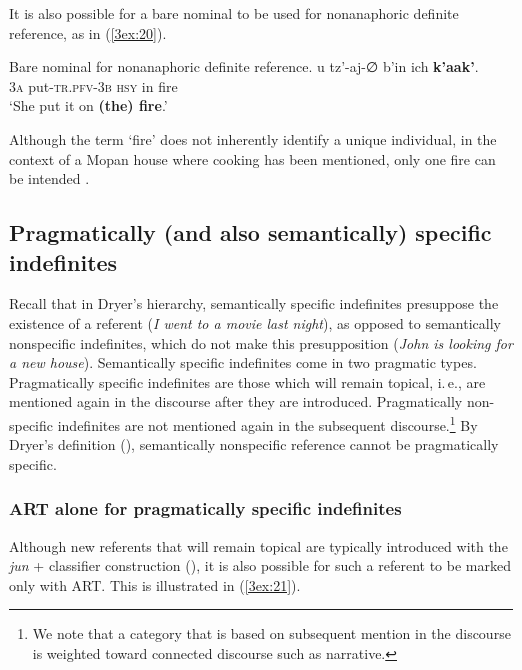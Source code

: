 \documentclass[output=paper]{langsci/langscibook}
\begin{document}
It is also possible for a bare nominal to be used for nonanaphoric definite reference, as in (\ref{3ex:20}).

\begin{exe}
\ex\label{3ex:20}
Bare nominal for nonanaphoric definite reference. 
\exi{}
\gll	u		tz'-aj-{∅}			b'in 			ich 	{\textbf{k'aak'}}. \\
	{\textsc{3a}}	put-{\textsc{tr.pfv-3b}}	{\textsc{hsy}}		in	fire \\
\glt	`She put it on {\textbf{(the) fire}}.'
\end{exe}
	
Although the term `fire' does not inherently identify a unique individual, in the context of a Mopan house where cooking has been mentioned, only one fire can be intended \citep[see, e.\,g.,][285]{lobner:11}.


\subsection{Pragmatically (and also semantically) specific indefinites}\label{3sec:33}

Recall that in Dryer's hierarchy, semantically specific indefinites presuppose the existence of a referent ({\emph{I went to a movie last night}}), as opposed to semantically nonspecific indefinites, which do not make this presupposition ({\emph{John is looking for a new house}}). Semantically specific indefinites come in two pragmatic types. Pragmatically specific indefinites are those which will remain topical, i.\,e., are mentioned again in the discourse after they are introduced. Pragmatically non-specific indefinites are not mentioned again in the subsequent discourse.\footnote{We note that a category that is based on subsequent mention in the discourse is weighted toward connected discourse such as narrative.} By Dryer's definition (\citeyear[][e237]{dryer:14}), semantically nonspecific reference cannot be pragmatically specific.

\subsubsection{ART alone for pragmatically specific indefinites}\label{3sec:331}

Although new referents that will remain topical are typically introduced with the {\emph{jun}} + classifier construction (), it is also possible for such a referent to be marked only with ART.  This is illustrated in (\ref{3ex:21}).
\end{document}
